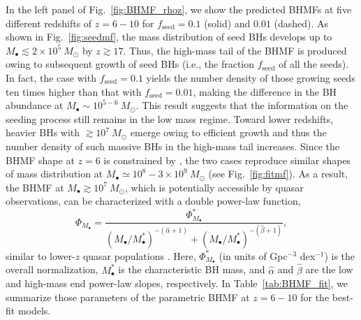 \documentclass[twocolumn, twocolappendix]{aastex63}
\newcommand{\Msun}{M_\odot}
\newcommand{\fseed}{f_\mathrm{seed}}
\begin{document}
\begin{CJK*}{UTF8}{gbsn}
In the left panel of Fig.~\ref{fig:BHMF_rhoz}, we show the predicted BHMFs at five different redshifts of $z=6-10$
for $\fseed=0.1$ (solid) and $0.01$ (dashed).
As shown in Fig.~\ref{fig:seedmf}, the mass distribution of seed BHs develops up to $M_\bullet \lesssim 2\times10^5~\Msun$ by $z\gtrsim 17$.
Thus, the high-mass tail of the BHMF is produced owing to subsequent growth of seed BHs (i.e., the fraction $\fseed$ of all the seeds).
In fact, the case with $\fseed=0.1$ yields the number density of those growing seeds ten times higher than that with $\fseed =0.01$,
making the difference in the BH abundance at $M_\bullet \sim 10^{5-6}~\Msun$.
This result suggests that the information on the seeding process still remains in the low mass regime.
Toward lower redshifts, heavier BHs with $\gtrsim 10^7~\Msun$ emerge owing to efficient growth
and thus the number density of such massive BHs in the high-mass tail increases.
Since the BHMF shape at $z=6$ is constrained by ,
the two cases reproduce similar shapes of mass distribution at $M_\bullet \simeq 10^8-3\times 10^9~\Msun$ (see Fig.~\ref{fig:fitmf}).
As a result, the BHMF at $M_\bullet \gtrsim 10^7~\Msun$, which is potentially accessible by quasar observations,
can be characterized with a double power-law function, 
%
\begin{equation}
\Phi_{M_\bullet}=\frac{\Phi_{M_\bullet}^\ast}{(M_\bullet/M_{\bullet}^\ast)^{-(\hat \alpha+1)} + (M_\bullet/M_{\bullet}^\ast)^{-(\hat \beta+1)}},
\end{equation}
%
similar to lower-$z$ quasar populations \citep[e.g.,][]{2013ApJ...764...45K,2015MNRAS.447.2085S}.
Here, $\Phi_{M_\bullet}^\ast$ (in units of Gpc$^{-3}$ dex$^{-1}$) is the overall normalization, $M_\bullet^\ast$ is the characteristic BH mass,
and $\hat \alpha$ and $\hat \beta$ are the low and high-mass end power-law slopes, respectively.
In Table~\ref{tab:BHMF_fit}, we summarize those parameters of the parametric BHMF at $z=6-10$ for the best-fit models.
%





\end{CJK*}
\end{document}
